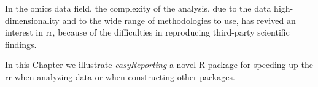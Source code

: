 In the omics data field, the complexity of the analysis, due to the data high-dimensionality and to the wide range of methodologies to use, has revived an interest in \gls{rr}, because of the difficulties in reproducing third-party scientific findings.

In this Chapter we illustrate \textit{easyReporting} a novel R package for speeding up the \gls{rr} when analyzing data or when constructing other packages.
